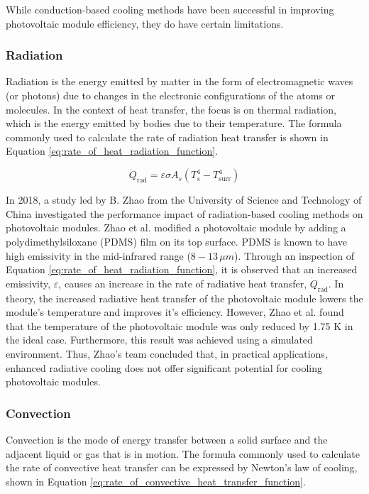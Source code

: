 While conduction-based cooling methods have been successful in improving photovoltaic module efficiency, they do have certain limitations.\par
\par

\subsubsection{Radiation}
Radiation is the energy emitted by matter in the form of electromagnetic waves (or photons) due to changes in the electronic configurations of the atoms or molecules. In the context of heat transfer, the focus is on thermal radiation, which is the energy emitted by bodies due to their temperature. The formula commonly used to calculate the rate of radiation heat transfer is shown in Equation \ref{eq:rate_of_heat_radiation_function}. \cite{Cengel2014IntroductionConcepts}

\begin{equation}
    \dot{Q}_\text{rad} = \varepsilon\sigma A_s (T_s^4-T_\text{surr}^4)
    \label{eq:rate_of_heat_radiation_function}
\end{equation}

In 2018, a study led by B. Zhao from the University of Science and Technology of China investigated the performance impact of radiation-based cooling methods on photovoltaic modules. Zhao et al. modified a photovoltaic module by adding a polydimethylsiloxane (PDMS) film on its top surface. PDMS is known to have high emissivity in the mid-infrared range ($8-13\,\mu m$). \cite{Song2020UltrahighRegime} Through an inspection of Equation \ref{eq:rate_of_heat_radiation_function}, it is observed that an increased emissivity, $\varepsilon$, causes an increase in the rate of radiative heat transfer, $\dot{Q}_\text{rad}$. In theory, the increased radiative heat transfer of the photovoltaic module lowers the module's temperature and improves it's efficiency. However, Zhao et al. found that the temperature of the photovoltaic module was only reduced by 1.75 K in the ideal case. Furthermore, this result was achieved using a simulated environment. Thus, Zhao's team concluded that, in practical applications, enhanced radiative cooling does not offer significant potential for cooling photovoltaic modules. \cite{Zhao2018PerformanceModule}


\subsubsection{Convection}
Convection is the mode of energy transfer between a solid surface and the adjacent liquid or gas that is in motion. The formula commonly used to calculate the rate of convective heat transfer can be expressed by Newton's law of cooling, shown in Equation \ref{eq:rate_of_convective_heat_transfer_function}. \cite{Cengel2014IntroductionConcepts}

